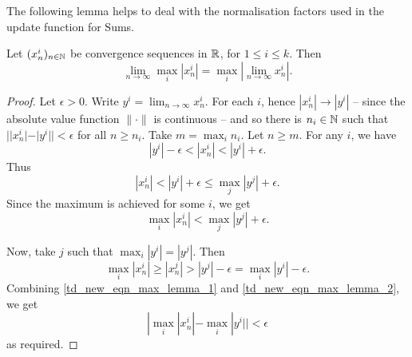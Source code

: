
The following lemma helps to deal with the normalisation factors used in the
update function for Sums.

\begin{lemma}
    \label{td_new_lemma_max_lemma}
    Let $(x^i_n)_{n \in \mathbb{N}}$ be convergence sequences in $\mathbb{R}$, for $1
    \le i \le k$. Then
    \[
        \lim_{n \to \infty}{\max_i{|x^i_n|}}
        = \max_i{|\lim_{n \to \infty}{x^i_n}|}.
    \]
\end{lemma}

\begin{proof}
    Let $\epsilon > 0$. Write $y^i = \lim_{n \to \infty}{x^i_n}$. For each $i$,
    hence $|x^i_n| \to |y^i|$ -- since the absolute value function $\|\cdot\|$
    is continuous -- and so there is $n_i \in \mathbb{N}$ such that $||x^i_n| -
    |y^i|| < \epsilon$ for all $n \ge n_i$. Take $m = \max_i{n_i}$. Let $n \ge
    m$. For any $i$, we have
    \[
        |y^i| - \epsilon < |x^i_n| < |y^i| + \epsilon.
    \]
    Thus
    \[
        |x^i_n|
        < |y^i| + \epsilon
        \le \max_j|y^j| + \epsilon.
    \]
    Since the maximum is achieved for some $i$, we get
    \begin{equation}
        \label{td_new_eqn_max_lemma_1}
        \max_i|x^i_n| < \max_j|y^j| + \epsilon.
    \end{equation}

    Now, take $j$ such that $\max_i|y^i| = |y^j|$. Then
    \begin{equation}
        \label{td_new_eqn_max_lemma_2}
        \max_i|x^i_n|
        \ge |x^j_n|
        > |y^j| - \epsilon
        = \max_i|y^i| - \epsilon.
    \end{equation}
    Combining \cref{td_new_eqn_max_lemma_1} and \cref{td_new_eqn_max_lemma_2},
    we get
    \[
        |\max_i|x^i_n| - \max_i|y^i|| < \epsilon
    \]
    as required.
\end{proof}

